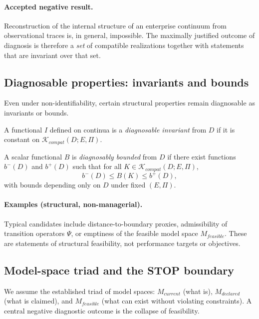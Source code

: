\paragraph{Accepted negative result.}
Reconstruction of the internal structure of an enterprise continuum from
observational traces is, in general, impossible.
The maximally justified outcome of diagnosis is therefore a \emph{set} of
compatible realizations together with statements that are invariant over that
set.

\subsection{Diagnosable properties: invariants and bounds}
Even under non-identifiability, certain structural properties remain diagnosable
as invariants or bounds.

\begin{definition}
\label{def:diagnosable_invariant}
A functional $I$ defined on continua is a \emph{diagnosable invariant} from $D$ if
it is constant on $\mathcal{K}_{compat}(D;E,\Pi)$.
\end{definition}

\begin{definition}
\label{def:diagnosable_bound}
A scalar functional $B$ is \emph{diagnosably bounded} from $D$ if there exist
functions $b^-(D)$ and $b^+(D)$ such that for all
$K \in \mathcal{K}_{compat}(D;E,\Pi)$,
\[
b^-(D) \le B(K) \le b^+(D),
\]
with bounds depending only on $D$ under fixed $(E,\Pi)$.
\end{definition}

\paragraph{Examples (structural, non-managerial).}
Typical candidates include distance-to-boundary proxies, admissibility of
transition operators $\Psi$, or emptiness of the feasible model space
$M_{feasible}$.
These are statements of structural feasibility, not performance targets or
objectives.

\subsection{Model-space triad and the STOP boundary}
We assume the established triad of model spaces:
$M_{current}$ (what is), $M_{declared}$ (what is claimed), and $M_{feasible}$
(what can exist without violating constraints).
A central negative diagnostic outcome is the collapse of feasibility.

